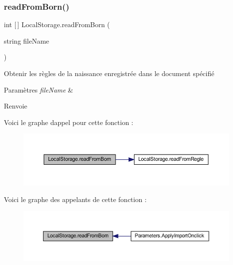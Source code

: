\subsubsection{\texorpdfstring{read\+From\+Born()}{readFromBorn()}}
{\footnotesize\ttfamily int \mbox{[}$\,$\mbox{]} Local\+Storage.\+read\+From\+Born (\begin{DoxyParamCaption}\item[{string}]{file\+Name }\end{DoxyParamCaption})\hspace{0.3cm}{\ttfamily [inline]}}



Obtenir les règles de la naissance enregistrée dans le document spécifié 


\begin{DoxyParams}{Paramètres}
{\em file\+Name} & \\
\hline
\end{DoxyParams}
\begin{DoxyReturn}{Renvoie}

\end{DoxyReturn}
Voici le graphe d\textquotesingle{}appel pour cette fonction \+:\nopagebreak
\begin{figure}[H]
\begin{center}
\leavevmode
\includegraphics[width=350pt]{class_local_storage_aa66a98dccf6cb550c5a38c25b9712898_cgraph}
\end{center}
\end{figure}
Voici le graphe des appelants de cette fonction \+:\nopagebreak
\begin{figure}[H]
\begin{center}
\leavevmode
\includegraphics[width=350pt]{class_local_storage_aa66a98dccf6cb550c5a38c25b9712898_icgraph}
\end{center}
\end{figure}
\mbox{\label{class_local_storage_a200c8f22ceed88238703411e2c0f1e05}} 
